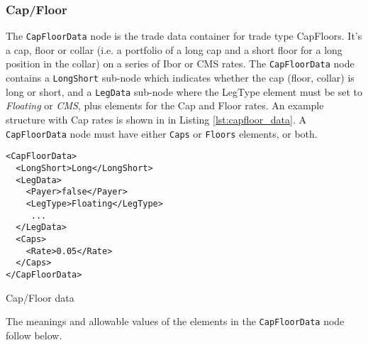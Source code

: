 \subsubsection{Cap/Floor}

The \lstinline!CapFloorData! node is the trade data container for trade type CapFloors.  It's a cap, floor or collar
(i.e. a portfolio of a long cap and a short floor for a long position in the collar) on a series of Ibor or CMS rates. The
\lstinline!CapFloorData! node contains a \lstinline!LongShort! sub-node which indicates whether the cap (floor, collar)
is long or short, and a \lstinline!LegData!  sub-node where the LegType element must be set to \emph{Floating} or \emph{CMS}, plus
elements for the Cap and Floor rates. An example structure with Cap rates is shown in in Listing
\ref{lst:capfloor_data}. A \lstinline!CapFloorData! node must have either \lstinline!Caps! or \lstinline!Floors!
elements, or both.

\begin{listing}[H]
\begin{verbatim}
<CapFloorData>
  <LongShort>Long</LongShort>
  <LegData>
    <Payer>false</Payer>
    <LegType>Floating</LegType>
     ...
  </LegData>
  <Caps>
    <Rate>0.05</Rate>
  </Caps>
</CapFloorData>
\end{verbatim}
\caption{Cap/Floor data}
\label{lst:capfloor_data}
\end{listing}

The meanings and allowable values of the elements in the \lstinline!CapFloorData!  node follow below.

